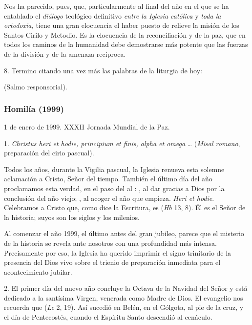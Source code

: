 \begin{body}
\begin{body}
Nos ha parecido, pues, que, particularmente al final del año en el que se ha entablado el \emph{diálogo} teológico definitivo \emph{entre la Iglesia católica} y \emph{toda la ortodoxia,} tiene una gran elocuencia el haber puesto de relieve la misión de los Santos Cirilo y Metodio. Es la elocuencia de la reconciliación y de la paz, que en todos los caminos de la humanidad debe demostrarse más potente que las fuerzas de la división y de la amenaza recíproca.

8. Termino citando una vez más las palabras de la liturgia de hoy:

 (Salmo responsorial).



\subsubsection{Homilía (1999)}

1 de enero de 1999. XXXII Jornada Mundial de la Paz.


1. \emph{Christus heri et hodie, principium et finis, alpha et omega} \ldots{}  (\emph{Misal romano}, preparación del cirio pascual).

Todos los años, durante la Vigilia pascual, la Iglesia renueva esta solemne aclamación a Cristo, Señor del tiempo. También el último día del año proclamamos esta verdad, en el paso del  al : , al dar gracias a Dios por la conclusión del año viejo; , al acoger el año que empieza. \emph{Heri et hodie}. Celebramos a Cristo que, como dice la Escritura, es  (\emph{Hb} 13, 8). Él es el Señor de la historia; suyos son los siglos y los milenios.

Al comenzar el año 1999, el último antes del gran jubileo, parece que el misterio de la historia se revela ante nosotros con una profundidad más intensa. Precisamente por eso, la Iglesia ha querido imprimir el signo trinitario de la presencia del Dios vivo sobre el trienio de preparación inmediata para el acontecimiento jubilar.

2. El primer día del nuevo año concluye la Octava de la Navidad del Señor y está dedicado a la santísima Virgen, venerada como Madre de Dios. El evangelio nos recuerda que  (\emph{Lc} 2, 19). Así sucedió en Belén, en el Gólgota, al pie de la cruz, y el día de Pentecostés, cuando el Espíritu Santo descendió al cenáculo.


\end{body}
\end{body}
